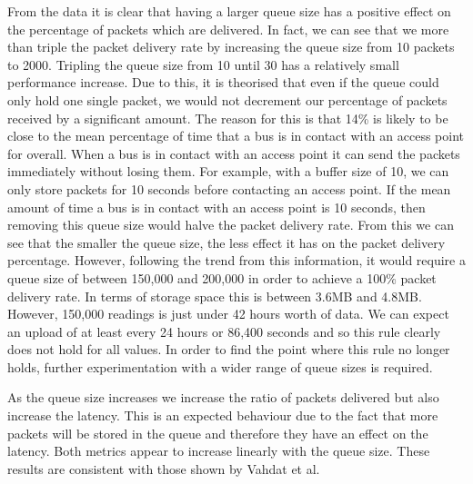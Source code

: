         From the data it is clear that having a larger queue size has a positive effect on the percentage of packets which are delivered. In fact, we can see that we more than triple the packet delivery rate by increasing the queue size from 10 packets to 2000. Tripling the queue size from 10 until 30 has a relatively small performance increase. Due to this, it is theorised that even if the queue could only hold one single packet, we would not decrement our percentage of packets received by a significant amount. The reason for this is that 14\% is likely to be close to the mean percentage of time that a bus is in contact with an access point for overall. When a bus is in contact with an access point it can send the packets immediately without losing them. For example, with a buffer size of 10, we can only store packets for 10 seconds before contacting an access point. If the mean amount of time a bus is in contact with an access point is 10 seconds, then removing this queue size would halve the packet delivery rate. From this we can see that the smaller the queue size, the less effect it has on the packet delivery percentage. However, following the trend from this information, it would require a queue size of between 150,000 and 200,000 in order to achieve a 100\% packet delivery rate. In terms of storage space this is between 3.6MB and 4.8MB. However, 150,000 readings is just under 42 hours worth of data. We can expect an upload of at least every 24 hours or 86,400 seconds and so this rule clearly does not hold for all values. In order to find the point where this rule no longer holds, further experimentation with a wider range of queue sizes is required.

        As the queue size increases we increase the ratio of packets delivered but also increase the latency. This is an expected behaviour due to the fact that more packets will be stored in the queue and therefore they have an effect on the latency. Both metrics appear to increase linearly with the queue size. These results are consistent with those shown by Vahdat et al.~\cite{vahdat2000epidemic}

